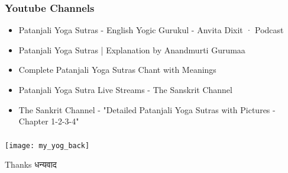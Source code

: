 \begin{frame}[fragile]\frametitle{Youtube Channels}



	\begin{itemize}
	\item Patanjali Yoga Sutras - English Yogic Gurukul - Anvita Dixit · Podcast
	\item Patanjali Yoga Sutras | Explanation by Anandmurti Gurumaa
	\item Complete Patanjali Yoga Sutras Chant with Meanings
	\item Patanjali Yoga Sutra Live Streams - The Sanskrit Channel
	\item The Sankrit Channel - "Detailed Patanjali Yoga Sutras with Pictures - Chapter 1-2-3-4"
	\end{itemize}

\end{frame}

\begin{frame}[fragile]\frametitle{}

\begin{center}
\texttt{[image: my\_yog\_back]}

Thanks धन्यवाद
\end{center}

\end{frame}
